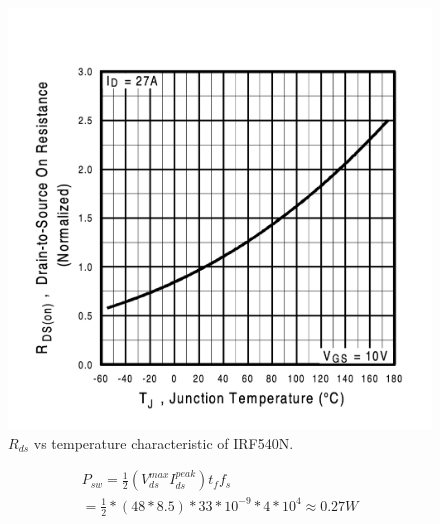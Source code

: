 \documentclass{article}
\begin{document}
\begin{figure}[H]
    \centering
    \includegraphics[scale=0.4]{Rds.png}
    \caption{$R_{ds}$ vs temperature characteristic of IRF540N.}
    \label{fig:my_label}
\end{figure}

\begin{gather*}
    P_{sw}=\frac{1}{2}(V_{ds}^{max}I_{ds}^{peak})t_ff_s\\
    =\frac{1}{2}*(48*8.5)*33*10^{-9}*4*10^4\approx0.27W\\
\end{gather*}
\end{document}
